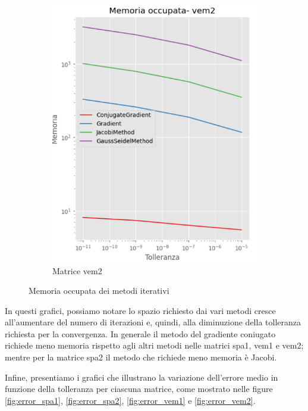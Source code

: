 \begin{figure}[!ht]
\begin{subfigure}{0.45\textwidth}
        \includegraphics[width=\textwidth]{./../report/Progetto_1_bis/img/mem_vem2.png}
        \caption{Matrice vem2}
        \label{fig:mem_vem2}
    \end{subfigure}
    \caption{Memoria occupata dei metodi iterativi}
    \label{fig:memory}
\end{figure}

In questi grafici, possiamo notare lo spazio richiesto dai vari metodi cresce
all'aumentare del numero di iterazioni e, quindi, alla diminuzione della tolleranza 
richiesta per la convergenza. In generale il metodo del gradiente coniugato richiede 
meno memoria rispetto agli altri metodi nelle matrici spa1, vem1 e vem2; mentre per 
la matrice spa2 il metodo che richiede meno memoria è Jacobi.

Infine, presentiamo i grafici che illustrano la variazione dell'errore medio in
funzione della tolleranza per ciascuna matrice, come mostrato nelle figure \ref{fig:error_spa1},
\ref{fig:error_spa2}, \ref{fig:error_vem1} e \ref{fig:error_vem2}.


